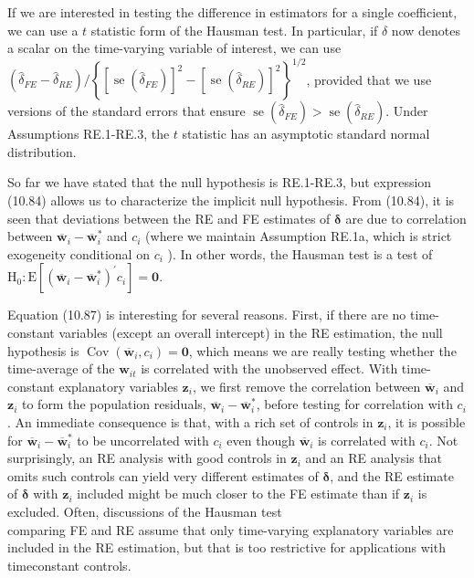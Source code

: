 \documentclass[10pt]{article}
\begin{document}
If we are interested in testing the difference in estimators for a single coefficient, we can use a $t$ statistic form of the Hausman test. In particular, if $\delta$ now denotes a scalar on the time-varying variable of interest, we can use $\left(\hat{\delta}_{F E}-\hat{\delta}_{R E}\right) /\left\{\left[\operatorname{se}\left(\hat{\delta}_{F E}\right)\right]^{2}-\right. \left.\left[\operatorname{se}\left(\hat{\delta}_{R E}\right)\right]^{2}\right\}^{1 / 2}$, provided that we use versions of the standard errors that ensure $\operatorname{se}\left(\hat{\delta}_{F E}\right)>\operatorname{se}\left(\hat{\delta}_{R E}\right)$. Under Assumptions RE.1-RE.3, the $t$ statistic has an asymptotic standard normal distribution.

So far we have stated that the null hypothesis is RE.1-RE.3, but expression (10.84) allows us to characterize the implicit null hypothesis. From (10.84), it is seen that deviations between the RE and FE estimates of $\boldsymbol{\delta}$ are due to correlation between $\overline{\mathbf{w}}_{i}-\overline{\mathbf{w}}_{i}^{*}$ and $c_{i}$ (where we maintain Assumption RE.1a, which is strict exogeneity conditional on $c_{i}$ ). In other words, the Hausman test is a test of\\
$\mathrm{H}_{0}: \mathrm{E}\left[\left(\overline{\mathbf{w}}_{i}-\overline{\mathbf{w}}_{i}^{*}\right)^{\prime} c_{i}\right]=\mathbf{0}$.

Equation (10.87) is interesting for several reasons. First, if there are no time-constant variables (except an overall intercept) in the RE estimation, the null hypothesis is $\operatorname{Cov}\left(\overline{\mathbf{w}}_{i}, c_{i}\right)=\mathbf{0}$, which means we are really testing whether the time-average of the $\mathbf{w}_{i t}$ is correlated with the unobserved effect. With time-constant explanatory variables $\mathbf{z}_{i}$, we first remove the correlation between $\overline{\mathbf{w}}_{i}$ and $\mathbf{z}_{i}$ to form the population residuals, $\overline{\mathbf{w}}_{i}-\overline{\mathbf{w}}_{i}^{*}$, before testing for correlation with $c_{i}$. An immediate consequence is that, with a rich set of controls in $\mathbf{z}_{i}$, it is possible for $\overline{\mathbf{w}}_{i}-\overline{\mathbf{w}}_{i}^{*}$ to be uncorrelated with $c_{i}$ even though $\overline{\mathbf{w}}_{i}$ is correlated with $c_{i}$. Not surprisingly, an RE analysis with good controls in $\mathbf{z}_{i}$ and an RE analysis that omits such controls can yield very different estimates of $\boldsymbol{\delta}$, and the RE estimate of $\boldsymbol{\delta}$ with $\mathbf{z}_{i}$ included might be much closer to the FE estimate than if $\mathbf{z}_{i}$ is excluded. Often, discussions of the Hausman test\\
comparing FE and RE assume that only time-varying explanatory variables are included in the RE estimation, but that is too restrictive for applications with timeconstant controls.
\end{document}
